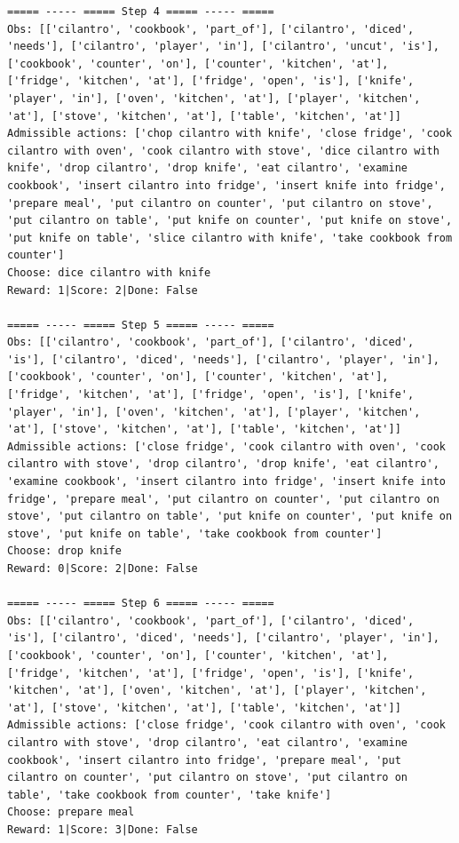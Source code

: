 \documentclass[11pt]{article}
\begin{document}
\begin{lstlisting}
===== ----- ===== Step 4 ===== ----- =====
Obs: [['cilantro', 'cookbook', 'part_of'], ['cilantro', 'diced', 'needs'], ['cilantro', 'player', 'in'], ['cilantro', 'uncut', 'is'], ['cookbook', 'counter', 'on'], ['counter', 'kitchen', 'at'], ['fridge', 'kitchen', 'at'], ['fridge', 'open', 'is'], ['knife', 'player', 'in'], ['oven', 'kitchen', 'at'], ['player', 'kitchen', 'at'], ['stove', 'kitchen', 'at'], ['table', 'kitchen', 'at']]
Admissible actions: ['chop cilantro with knife', 'close fridge', 'cook cilantro with oven', 'cook cilantro with stove', 'dice cilantro with knife', 'drop cilantro', 'drop knife', 'eat cilantro', 'examine cookbook', 'insert cilantro into fridge', 'insert knife into fridge', 'prepare meal', 'put cilantro on counter', 'put cilantro on stove', 'put cilantro on table', 'put knife on counter', 'put knife on stove', 'put knife on table', 'slice cilantro with knife', 'take cookbook from counter']
Choose: dice cilantro with knife
Reward: 1|Score: 2|Done: False

===== ----- ===== Step 5 ===== ----- =====
Obs: [['cilantro', 'cookbook', 'part_of'], ['cilantro', 'diced', 'is'], ['cilantro', 'diced', 'needs'], ['cilantro', 'player', 'in'], ['cookbook', 'counter', 'on'], ['counter', 'kitchen', 'at'], ['fridge', 'kitchen', 'at'], ['fridge', 'open', 'is'], ['knife', 'player', 'in'], ['oven', 'kitchen', 'at'], ['player', 'kitchen', 'at'], ['stove', 'kitchen', 'at'], ['table', 'kitchen', 'at']]
Admissible actions: ['close fridge', 'cook cilantro with oven', 'cook cilantro with stove', 'drop cilantro', 'drop knife', 'eat cilantro', 'examine cookbook', 'insert cilantro into fridge', 'insert knife into fridge', 'prepare meal', 'put cilantro on counter', 'put cilantro on stove', 'put cilantro on table', 'put knife on counter', 'put knife on stove', 'put knife on table', 'take cookbook from counter']
Choose: drop knife
Reward: 0|Score: 2|Done: False

===== ----- ===== Step 6 ===== ----- =====
Obs: [['cilantro', 'cookbook', 'part_of'], ['cilantro', 'diced', 'is'], ['cilantro', 'diced', 'needs'], ['cilantro', 'player', 'in'], ['cookbook', 'counter', 'on'], ['counter', 'kitchen', 'at'], ['fridge', 'kitchen', 'at'], ['fridge', 'open', 'is'], ['knife', 'kitchen', 'at'], ['oven', 'kitchen', 'at'], ['player', 'kitchen', 'at'], ['stove', 'kitchen', 'at'], ['table', 'kitchen', 'at']]
Admissible actions: ['close fridge', 'cook cilantro with oven', 'cook cilantro with stove', 'drop cilantro', 'eat cilantro', 'examine cookbook', 'insert cilantro into fridge', 'prepare meal', 'put cilantro on counter', 'put cilantro on stove', 'put cilantro on table', 'take cookbook from counter', 'take knife']
Choose: prepare meal
Reward: 1|Score: 3|Done: False


\end{lstlisting}
\end{document}
